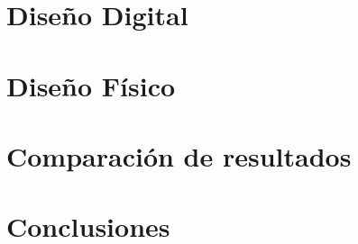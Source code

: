 \documentclass[twoside,12pt, pdftex]{classes/CUEDthesisPSnPDF}
\begin{document}
\sloppy

\maketitle
%

\tableofcontents			%
\listoffigures 
\listoftables 

\mainmatter

\part{Diseño Digital}\label{diseño_digital}

%

\part{Diseño Físico}\label{diseño_físico}


\part{Comparación de resultados}\label{comparacion_resultados}

\part{Conclusiones}

\appendix


%
\backmatter


\pagestyle{fancyplain}                                                            %
\renewcommand{\partname}{PARTE}
\renewcommand{\chaptermark}[1]{\markboth{\textbf{\small{CAPÍTULO \thechapter}}}{}}%
\renewcommand{\sectionmark}[1]{\markright{\textbf{\small{\thesection. #1}}}}      %






\end{document}
